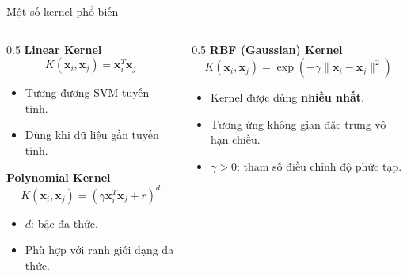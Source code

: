 \begin{frame}{Một số kernel phổ biến}
  \begin{columns}[T]
    \begin{column}{0.5\textwidth}
      \textbf{Linear Kernel}
      \[
      K(\mathbf{x}_i, \mathbf{x}_j) = \mathbf{x}_i^T \mathbf{x}_j
      \]
      \begin{itemize}
        \item Tương đương SVM tuyến tính.
        \item Dùng khi dữ liệu gần tuyến tính.
      \end{itemize}
      \vspace{0.3cm}
      \textbf{Polynomial Kernel}
      \[
      K(\mathbf{x}_i, \mathbf{x}_j) = (\gamma \mathbf{x}_i^T \mathbf{x}_j + r)^d
      \]
      \begin{itemize}
        \item $d$: bậc đa thức.
        \item Phù hợp với ranh giới dạng đa thức.
      \end{itemize}
    \end{column}
    \begin{column}{0.5\textwidth}
      \textbf{RBF (Gaussian) Kernel}
      \[
      K(\mathbf{x}_i, \mathbf{x}_j) = \exp\left(-\gamma \|\mathbf{x}_i - \mathbf{x}_j\|^2\right)
      \]
      \begin{itemize}
        \item Kernel được dùng \textbf{nhiều nhất}.
        \item Tương ứng không gian đặc trưng vô hạn chiều.
        \item $\gamma > 0$: tham số điều chỉnh độ phức tạp.
      \end{itemize}
    \end{column}
  \end{columns}
\end{frame}

